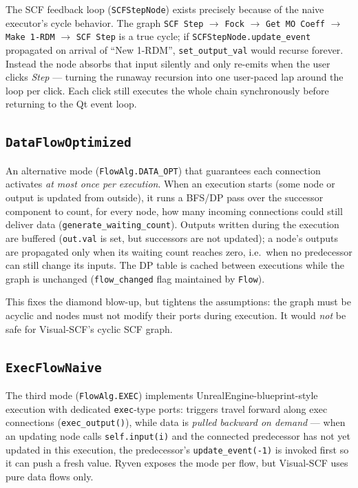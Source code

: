 \documentclass[10pt,a4paper]{article}
\newcommand{\code}[1]{\texttt{\small #1}}
\begin{document}
\begin{scfnote}
The SCF feedback loop (\code{SCFStepNode}) exists precisely because of the naive
executor's cycle behavior. The graph
\code{SCF Step} $\to$ \code{Fock} $\to$ \code{Get MO Coeff} $\to$ \code{Make 1-RDM}
$\to$ \code{SCF Step} is a true cycle; if \code{SCFStepNode.update\_event} propagated
on arrival of ``New 1-RDM'', \code{set\_output\_val} would recurse forever.
Instead the node absorbs that input silently and only re-emits when the user clicks
\emph{Step} --- turning the runaway recursion into one user-paced lap around the loop
per click. Each click still executes the whole chain synchronously before returning
to the Qt event loop.
\end{scfnote}

\subsection{\texttt{DataFlowOptimized}}

An alternative mode (\code{FlowAlg.DATA\_OPT}) that guarantees each connection activates
\emph{at most once per execution}. When an execution starts (some node or output is
updated from outside), it runs a BFS/DP pass over the successor component to count, for
every node, how many incoming connections could still deliver data
(\code{generate\_waiting\_count}). Outputs written during the execution are buffered
(\code{out.val} is set, but successors are not updated); a node's outputs are propagated
only when its waiting count reaches zero, i.e.\ when no predecessor can still change its
inputs. The DP table is cached between executions while the graph is unchanged
(\code{flow\_changed} flag maintained by \code{Flow}).

This fixes the diamond blow-up, but tightens the assumptions: the graph must be acyclic
and nodes must not modify their ports during execution. It would \emph{not} be safe for
Visual-SCF's cyclic SCF graph.

\subsection{\texttt{ExecFlowNaive}}

The third mode (\code{FlowAlg.EXEC}) implements UnrealEngine-blueprint-style execution
with dedicated \code{exec}-type ports: triggers travel forward along exec connections
(\code{exec\_output()}), while data is \emph{pulled backward on demand} --- when an
updating node calls \code{self.input(i)} and the connected predecessor has not yet
updated in this execution, the predecessor's \code{update\_event(-1)} is invoked first
so it can push a fresh value. Ryven exposes the mode per flow, but Visual-SCF uses pure
data flows only.
\end{document}
